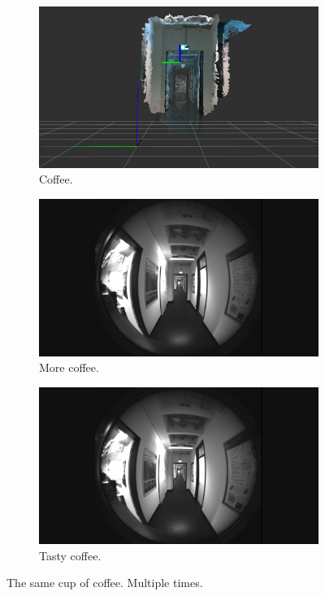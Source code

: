 \begin{figure}[h!]
	\begin{subfigure}[b]{0.31\linewidth}
	\includegraphics[width=\linewidth]{images/dataset/pointcloud2.png}
	\caption{Coffee.}
	\end{subfigure}
	\begin{subfigure}[b]{0.31\linewidth}
		\includegraphics[width=\linewidth]{images/dataset/f1_frame000005.png}
		\caption{More coffee.}
	\end{subfigure}
	\begin{subfigure}[b]{0.31\linewidth}
		\includegraphics[width=\linewidth]{images/dataset/f2_frame000005.png}
		\caption{Tasty coffee.}
	\end{subfigure}
	\caption{The same cup of coffee. Multiple times.}
	\label{fig:coffee3}
\end{figure}


